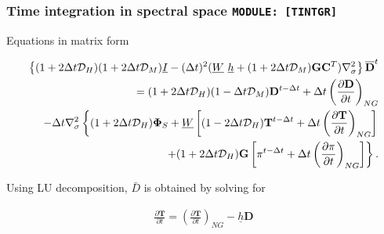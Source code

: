 \hypertarget{time-integration-in-spectral-space-module-tintgr}{%
\subsubsection{\texorpdfstring{Time integration in spectral space
\texttt{MODULE:\ {[}TINTGR{]}}}{Time integration in spectral space MODULE: {[}TINTGR{]}}}\label{time-integration-in-spectral-space-module-tintgr}}

Equations in matrix form

\begin{eqnarray}
      \left\{ ( 1+2\Delta t {\mathcal D}_H )( 1+2\Delta t {\mathcal D}_M )
           \underline{I}  
      - ( \Delta t )^{2}  ( \underline{W} \ \underline{h}
           + (1+2\Delta t {\mathcal D}_M)
             {\mathbf{G}} {\mathbf{C}}^{T} ) \nabla^{2}_{\sigma}
  \right\}
      \overline{ {\mathbf{D}} }^{t}
       \\
  = ( 1+2\Delta t {\mathcal D}_H )( 1-\Delta t {\mathcal D}_M )
       {\mathbf{D}}^{t-\Delta t}
  +\Delta t
         \left( \frac{\partial {\mathbf{D}}}{\partial t} \right)_{NG}  
  \\
  -\Delta t \nabla^{2}_{\sigma}     
                   \left\{  ( 1+2\Delta t {\mathcal D}_H ) {\mathbf{\Phi}}_{S}
                          + \underline{W}
                            \left[ ( 1-2\Delta t {\mathcal D}_H )
                                    {\mathbf{T}}^{t-\Delta t}
                                  + \Delta t
                                      \left( \frac{\partial {\mathbf{T}}}
                                                  {\partial t}     
                                      \right)_{NG} \right]
                   \right.
  \\
                 \left.  \hspace*{20mm}
                          + ( 1+2\Delta t {\mathcal D}_H ) {\mathbf{G}}
                            \left[ \pi^{t-\Delta t}
                                  + \Delta t
                                     \left( \frac{\partial \pi}
                                                 {\partial t}
                                     \right)_{NG}  \right]
                   \right\} .
\end{eqnarray}

Using LU decomposition, \(\bar{D}\) is obtained by solving for

\begin{eqnarray}
  \frac{\partial {\mathbf{T}}}{\partial t}
      =   \left( \frac{\partial {\mathbf{T}}}
                        {\partial t}       \right)_{NG}  
         - \underline{h} {\mathbf{D}}
\end{eqnarray}

